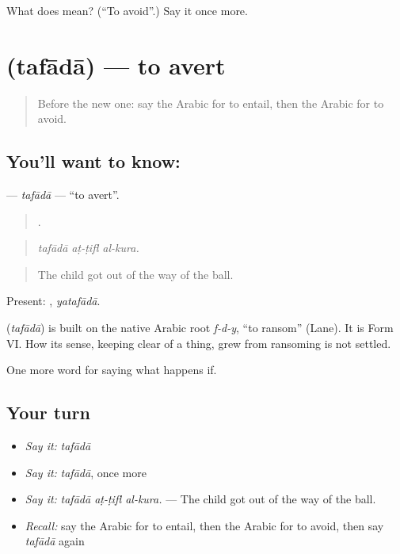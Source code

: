 \begin{tcolorbox}[breakable,colback=teal!4,colframe=teal!35!black,title={Before you move on}]
What does  mean? (\textquotedblleft{}To avoid\textquotedblright{}.) Say it once more.
\end{tcolorbox}
\section[\texorpdfstring{\ar{تفادى} (tafādā)}{تفادى (tafādā)}]{ (tafādā) — to avert}

\label{lesson:AR-C407-tafada}



\begin{quote}
Before the new one: say the Arabic for to entail, then the Arabic for to avoid.
\end{quote}

\subsection*{You'll want to know: }
\textbf{} — \emph{tafādā} — \textquotedblleft{}to avert\textquotedblright{}.

\begin{quote}
  .
\end{quote}

\begin{quote}
\emph{tafādā aṭ-ṭifl al-kura.}
\end{quote}

\begin{quote}
The child got out of the way of the ball.
\end{quote}

Present: , \emph{yatafādā}.

\begin{cousinweb}
\textbf{} (\emph{tafādā}) is built on the native Arabic root \emph{f-d-y}, \textquotedblleft{}to ransom\textquotedblright{} (Lane). It is Form VI. How its sense, keeping clear of a thing, grew from ransoming is not settled.
\end{cousinweb}

\begin{grammarlens}[title={What you've built}]
One more word for saying what happens if.
\end{grammarlens}

\subsection*{Your turn}
\begin{itemize}
\raggedright
  \item \emph{Say it:} \emph{tafādā}
  \item \emph{Say it:} \emph{tafādā}, once more
  \item \emph{Say it:} \emph{tafādā aṭ-ṭifl al-kura.} — The child got out of the way of the ball.
  \item \emph{Recall:} say the Arabic for to entail, then the Arabic for to avoid, then say \emph{tafādā} again
\end{itemize}

